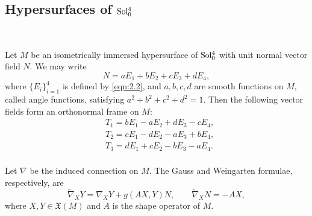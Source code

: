 \documentclass[reqno]{amsart}%
\theoremstyle{definition}
\numberwithin{equation}{section}
\begin{document}
	
	\subsection{Hypersurfaces of \texorpdfstring{${\rm Sol_0^4}$}{Sol40}}\label{sect:2.2}~
	
	Let $M$ be an isometrically immersed hypersurface of ${\rm Sol_0^4}$ with unit normal vector field $N$.
	We may write
	$$
	N=aE_1+bE_2+cE_3+dE_4,
	$$
	where $\{E_i\}_{i=1}^4$ is defined by \eqref{eqn:2.2}, and
	$a, b, c, d$ are smooth functions on $M$, called angle functions, satisfying
	$a^2+b^2+c^2+d^2=1$.
	Then the following vector fields form an orthonormal frame on $M$:
	\begin{equation}\label{eqn:8.1}
		\begin{aligned}
			&T_1=bE_1-aE_2+dE_3-cE_4, \\
			&T_2=cE_1-dE_2-aE_3+bE_4, \\
			&T_3=dE_1+cE_2-bE_3-aE_4. \\
		\end{aligned}
	\end{equation}
	
	Let $\nabla$ be the induced connection on $M$. The Gauss and Weingarten formulae, respectively, are
	$$
	\tilde{\nabla}_XY=\nabla_XY+g(AX,Y)N, \qquad \tilde{\nabla}_XN=-AX, 
	$$
	where $X,Y \in \mathfrak X(M)$ and $A$ is the shape operator of $M$.
	
\end{document}
